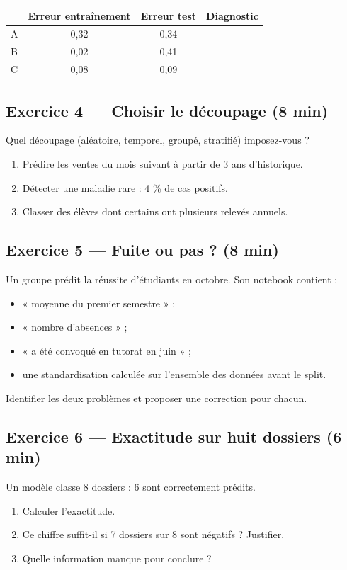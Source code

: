 \begin{center}
\small
\begin{tabular}{@{}lccc@{}}
\toprule
& \textbf{Erreur entraînement} & \textbf{Erreur test} & \textbf{Diagnostic} \\
\midrule
A & 0,32 & 0,34 & \\
B & 0,02 & 0,41 & \\
C & 0,08 & 0,09 & \\
\bottomrule
\end{tabular}
\end{center}

\subsection*{Exercice 4 --- Choisir le découpage \hfill \normalfont\footnotesize (8 min)}
Quel découpage (aléatoire, temporel, groupé, stratifié) imposez-vous ?
\begin{enumerate}
  \item Prédire les ventes du mois suivant à partir de 3 ans d'historique.
  \item Détecter une maladie rare : 4 \% de cas positifs.
  \item Classer des élèves dont certains ont plusieurs relevés annuels.
\end{enumerate}

\subsection*{Exercice 5 --- Fuite ou pas ? \hfill \normalfont\footnotesize (8 min)}
Un groupe prédit la réussite d'étudiants en octobre. Son notebook contient :
\begin{itemize}
  \item « moyenne du premier semestre » ;
  \item « nombre d'absences » ;
  \item « a été convoqué en tutorat en juin » ;
  \item une standardisation calculée sur l'ensemble des données avant le split.
\end{itemize}
Identifier les deux problèmes et proposer une correction pour chacun.


\subsection*{Exercice 6 --- Exactitude sur huit dossiers \hfill \normalfont\footnotesize (6 min)}
Un modèle classe 8 dossiers : 6 sont correctement prédits.
\begin{enumerate}
  \item Calculer l'exactitude.
  \item Ce chiffre suffit-il si 7 dossiers sur 8 sont négatifs ? Justifier.
  \item Quelle information manque pour conclure ?
\end{enumerate}

